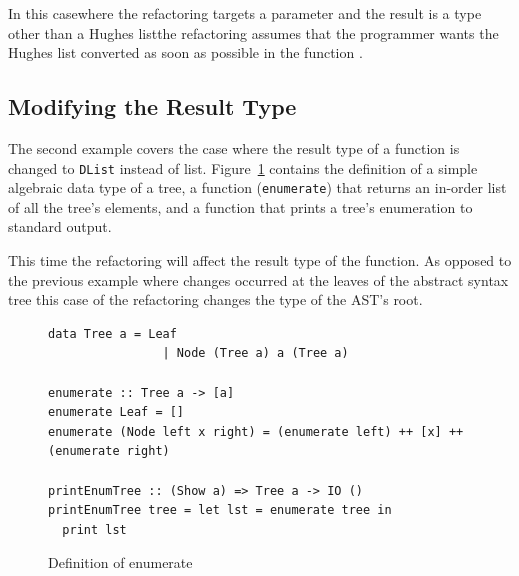 In this case\DIFaddbegin \DIFadd{, }\DIFaddend where the refactoring targets a parameter and the \DIFdelbegin {}\DIFdelend result is a type other than a Hughes list\DIFaddbegin \DIFadd{, }\DIFaddend the refactoring assumes that the programmer wants the Hughes list converted as soon as possible in the function \DIFaddbegin {}\texttt{} \DIFaddend . 

\subsection{Modifying the Result Type}
\label{hugesListResTy}

The second example covers the case where the result type of a function is changed to \texttt{DList} instead of list. Figure~\ref{enumBefore} contains the definition of a simple algebraic data type of a tree, a function (\texttt{enumerate}) that returns an in-order list of all the tree's elements, and a function that prints a tree's enumeration to standard output. 

This time the refactoring will affect the result type of the function. As opposed to the previous example where changes occurred at the leaves of the abstract syntax tree this case of the refactoring changes the type of the AST's root. 

\begin{figure}[t]
\DIFdelbeginFL %


\DIFdelendFL \DIFaddbeginFL \begin{lstlisting}
data Tree a = Leaf
                | Node (Tree a) a (Tree a)

enumerate :: Tree a -> [a]
enumerate Leaf = []
enumerate (Node left x right) = (enumerate left) ++ [x] ++ (enumerate right)

printEnumTree :: (Show a) => Tree a -> IO ()
printEnumTree tree = let lst = enumerate tree in
  print lst
\end{lstlisting}
\DIFaddendFL \caption{Definition of enumerate}
\label{enumBefore}
\end{figure} 

